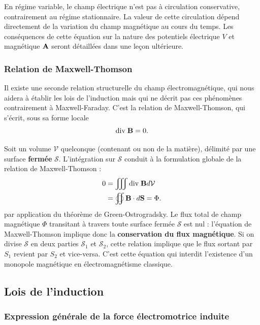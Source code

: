 \documentclass[11pt,a4paper]{report}
\begin{document}
En régime variable, le champ électrique n'est pas à circulation conservative, contrairement au régime stationnaire. La valeur de cette circulation dépend directement de la variation du champ magnétique au cours du temps. Les conséquences de cette équation sur la nature des potentiels électrique $V$ et magnétique $\bold{A}$ seront détaillées dans une leçon ultérieure.
	
\subsubsection{Relation de Maxwell-Thomson}
Il existe une seconde relation structurelle du champ électromagnétique, qui nous aidera à établir les lois de l'induction mais qui ne décrit pas ces phénomènes contrairement à Maxwell-Faraday. C'est la relation de Maxwell-Thomson, qui s'écrit, sous sa forme locale	
	\begin{equation}
		\text{div}\;\bold{B} = 0.
	\end{equation}
	
Soit un volume $\mathcal{V}$ quelconque (contenant ou non de la matière), délimité par une surface \textbf{fermée} $\mathcal{S}$. L'intégration sur $\mathcal{S}$ conduit à la formulation globale de la relation de Maxwell-Thomson :
	\begin{align}
   		0 & = \iiint \text{div}\;\bold{B} d\mathcal{V}\\
   	 	  & = \oiint \bold{B}\cdot d\bold{S} = \Phi. 
	\end{align}
	par application du théorème de Green-Ostrogradsky. Le flux total de champ magnétique $\Phi$ transitant à travers toute surface fermée $\mathcal{S}$ est nul : 
	l'équation de Maxwell-Thomson implique donc la \textbf{conservation du flux magnétique}. Si on divise $\mathcal{S}$ en deux parties $\mathcal{S}_1$ et $\mathcal{S}_2$, 
	cette relation implique que le flux sortant par $S_1$ revient par $S_2$ et vice-versa. C'est cette équation qui interdit l'existence d'un monopole magnétique en 
	électromagnétisme classique.
		
\subsection{Lois de l'induction}	
	
	\subsubsection{Expression générale de la force électromotrice induite}
	
\end{document}
